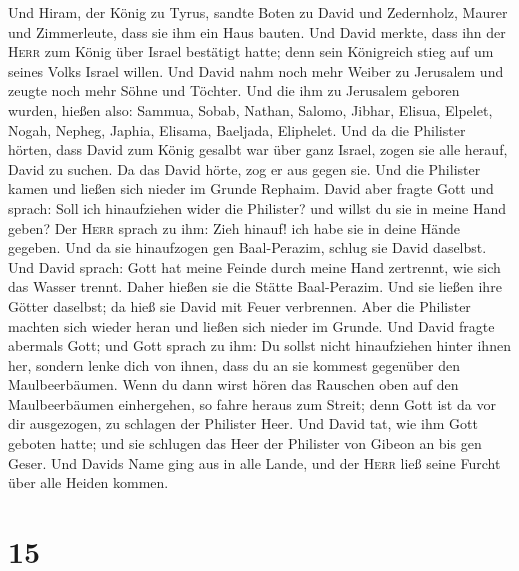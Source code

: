  Und Hiram, der König zu Tyrus, sandte Boten zu David und
Zedernholz, Maurer und Zimmerleute, dass sie ihm ein Haus bauten.
 Und David merkte, dass ihn der \textsc{Herr} zum König
über Israel bestätigt hatte; denn sein Königreich stieg auf um seines
Volks Israel willen.  Und David nahm noch mehr Weiber zu
Jerusalem und zeugte noch mehr Söhne und Töchter.  Und die
ihm zu Jerusalem geboren wurden, hießen also: Sammua, Sobab, Nathan,
Salomo,  Jibhar, Elisua, Elpelet,  Nogah,
Nepheg, Japhia,  Elisama, Baeljada, Eliphelet.
 Und da die Philister hörten, dass David zum König gesalbt
war über ganz Israel, zogen sie alle herauf, David zu suchen. Da das
David hörte, zog er aus gegen sie.  Und die Philister
kamen und ließen sich nieder im Grunde Rephaim.  David
aber fragte Gott und sprach: Soll ich hinaufziehen wider die Philister?
und willst du sie in meine Hand geben? Der \textsc{Herr} sprach zu ihm:
Zieh hinauf! ich habe sie in deine Hände gegeben.  Und da
sie hinaufzogen gen Baal-Perazim, schlug sie David daselbst. Und David
sprach: Gott hat meine Feinde durch meine Hand zertrennt, wie sich das
Wasser trennt. Daher hießen sie die Stätte Baal-Perazim. 
Und sie ließen ihre Götter daselbst; da hieß sie David mit Feuer
verbrennen.  Aber die Philister machten sich wieder heran
und ließen sich nieder im Grunde.  Und David fragte
abermals Gott; und Gott sprach zu ihm: Du sollst nicht hinaufziehen
hinter ihnen her, sondern lenke dich von ihnen, dass du an sie kommest
gegenüber den Maulbeerbäumen.  Wenn du dann wirst hören
das Rauschen oben auf den Maulbeerbäumen einhergehen, so fahre heraus
zum Streit; denn Gott ist da vor dir ausgezogen, zu schlagen der
Philister Heer.  Und David tat, wie ihm Gott geboten
hatte; und sie schlugen das Heer der Philister von Gibeon an bis gen
Geser.  Und Davids Name ging aus in alle Lande, und der
\textsc{Herr} ließ seine Furcht über alle Heiden kommen.

\hypertarget{section-14}{%
\section{15}\label{section-14}}

